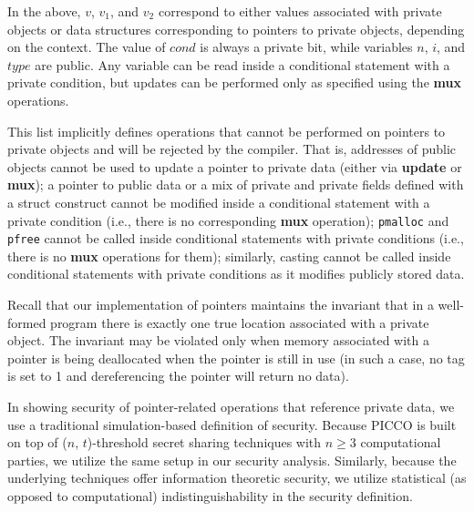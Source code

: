 \documentclass[11pt]{article}
\begin{document}
In the above, $v$, $v_1$, and $v_2$ correspond to either values associated
with private objects or data structures corresponding to pointers to private
objects, depending on the context. The value of $cond$ is always a private
bit, while variables $n$, $i$, and $type$ are public. Any variable can be
read inside a conditional statement with a private condition, but updates
can be performed only as specified using the \textbf{mux} operations.

This list implicitly defines operations that cannot be performed on pointers
to private objects and will be rejected by the compiler. That is, addresses
of public objects cannot be used to update a pointer to private data (either
via \textbf{update} or \textbf{mux}); a pointer to public data or a mix of
private and private fields defined with a struct construct cannot be
modified inside a conditional statement with a private condition (i.e.,
there is no corresponding \textbf{mux} operation); \texttt{pmalloc} and
\texttt{pfree} cannot be called inside conditional statements with private
conditions (i.e., there is no \textbf{mux} operations for them); similarly,
casting cannot be called inside conditional statements with private
conditions as it modifies publicly stored data.

Recall that our implementation of pointers maintains the invariant that in a
well-formed program there is exactly one true location associated with a
private object. The invariant may be violated only when memory associated
with a pointer is being deallocated when the pointer is still in use (in
such a case, no tag is set to 1 and dereferencing the pointer will return no
data).

In showing security of pointer-related operations that reference private
data, we use a traditional simulation-based definition of security. Because
PICCO is built on top of ($n$, $t$)-threshold secret sharing techniques with
$n \ge 3$ computational parties, we utilize the same setup in our security
analysis. Similarly, because the underlying techniques offer information
theoretic security, we utilize statistical (as opposed to computational)
indistinguishability in the security definition.  
\end{document}
